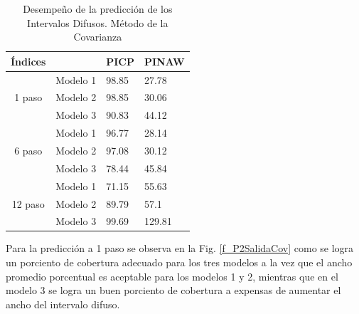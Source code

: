 \documentclass[12pt]{article}
\begin{document}
\begin{table}[htbp]
  \centering
  \caption{ Desempeño de la predicción de los Intervalos Difusos. Método de la Covarianza}
    \begin{tabular}{|c|c|l|l|}
\hline
\multicolumn{1}{|l|}{Índices} & \multicolumn{1}{l|}{} & PICP  & PINAW  \\ \hline
\multirow{3}{*}{1   paso}     & Modelo 1              & 98.85 & 27.78  \\ \cline{2-4}
                              & Modelo 2              & 98.85 & 30.06  \\ \cline{2-4}
                              & Modelo 3              & 90.83 & 44.12  \\ \hline
\multirow{3}{*}{6   paso}     & Modelo 1              & 96.77 & 28.14  \\ \cline{2-4}
                              & Modelo 2              & 97.08 & 30.12  \\ \cline{2-4}
                              & Modelo 3              & 78.44 & 45.84  \\ \hline
\multirow{3}{*}{12   paso}    & Modelo 1              & 71.15 & 55.63  \\ \cline{2-4}
                              & Modelo 2              & 89.79 & 57.1   \\ \cline{2-4}
                              & Modelo 3              & 99.69 & 129.81 \\ \hline
\end{tabular}
  \label{t_MDPCov}%
\end{table}%

Para la predicción a 1 paso se observa en la Fig. \ref{f_P2SalidaCov} como se logra un porciento de cobertura adecuado para los tres modelos a la vez que el ancho promedio porcentual es aceptable para los modelos 1 y 2, mientras que en el modelo 3 se logra un buen porciento de cobertura a expensas de aumentar el ancho del intervalo difuso.
\end{document}
